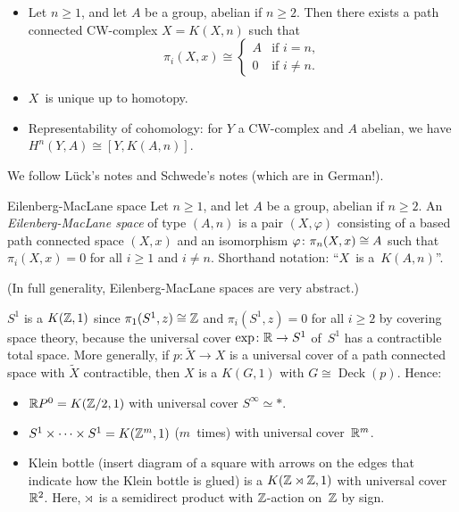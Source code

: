 \documentclass[language=english]{TemplateLecture}
\begin{document}
\begin{itemize}
    \item Let \(n \ge 1\), and let \(A\) be a group, abelian if \(n \ge 2\).
        Then there exists a path connected CW-complex \(X = K(X,n)\) such that
        \begin{equation*}
            \pi_i(X,x) \cong
            \begin{cases}
                A & \text{if } i = n, \\
                0 & \text{if } i \ne n.
            \end{cases}
        \end{equation*}
    \item \(X\)~is unique up to homotopy.
    \item Representability of cohomology: for \(Y\) a CW-complex and \(A\) abelian, we have \(H^n(Y,A) \cong [Y, K(A,n)]\).
\end{itemize}

We follow Lück's notes and Schwede's notes (which are in German!).

\begin{defi}{Eilenberg-MacLane space}{}
    Let \(n \ge 1\), and let \(A\) be a group, abelian if \(n \ge 2\).
    An \emph{Eilenberg-MacLane space} of type \((A,n)\) is a pair \((X, \varphi)\) consisting of a based path connected space \((X,x)\) and an isomorphism \(\varphi \colon \pi_n(X,x) \cong A\) such that \(\pi_i(X,x) = 0\) for all \(i \ge 1\) and \(i \ne n\).
    Shorthand notation: \enquote{\(X\)~is a~\(K(A,n)\)}.
\end{defi}

(In full generality, Eilenberg-MacLane spaces are very abstract.)

\begin{example}
    \(S^1\) is a \(K(\mathbb{Z},1)\) since \(\pi_1(S^1,z) \cong \mathbb{Z}\) and \(\pi_i(S^1,z) = 0\) for all \(i \ge 2\) by covering space theory, because the universal cover \(\exp \colon \mathbb{R} \to S^1\) of~\(S^1\) has a contractible total space.
    More generally, if \(p \colon \tilde{X} \to X\) is a universal cover of a path connected space with \(\tilde{X}\) contractible, then \(X\) is a \(K(G,1)\) with \(G \cong \operatorname{Deck}(p)\).
    Hence:
    \begin{itemize}
        \item \(\mathbb{R} P^0 = K(\mathbb{Z}/2, 1)\) with universal cover \(S^{\infty} \simeq *\).
        \item \(S^1 \times \dots \times S^1 = K(\mathbb{Z}^m, 1)\) (\(m\)~times) with universal cover~\(\mathbb{R}^m\).
        \item Klein bottle (insert diagram of a square with arrows on the edges that indicate how the Klein bottle is glued) is a \(K(\mathbb{Z} \rtimes \mathbb{Z}, 1)\) with universal cover~\(\mathbb{R}^2\).
            Here, \(\rtimes\)~is a semidirect product with \(\mathbb{Z}\)-action on~\(\mathbb{Z}\) by sign.
    \end{itemize}
\end{example}
\end{document}
